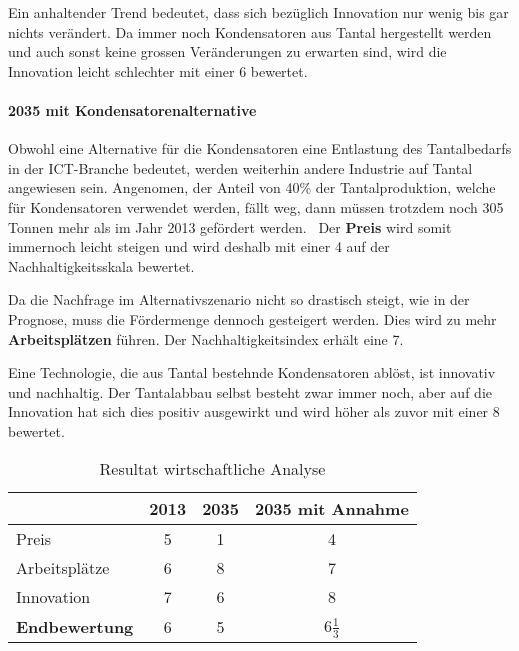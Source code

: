 Ein anhaltender Trend bedeutet, dass sich bezüglich Innovation nur wenig bis gar nichts verändert. Da immer noch Kondensatoren aus Tantal hergestellt werden und auch sonst keine grossen Veränderungen zu erwarten sind, wird die Innovation leicht schlechter mit einer 6 bewertet.

\paragraph{2035 mit Kondensatorenalternative}
Obwohl eine Alternative für die Kondensatoren eine Entlastung des Tantalbedarfs in der ICT-Branche bedeutet, werden weiterhin andere Industrie auf Tantal angewiesen sein. Angenomen, der Anteil von 40\% der Tantalproduktion, welche für Kondensatoren verwendet werden, fällt weg, dann müssen trotzdem noch 305 Tonnen mehr als im Jahr 2013 gefördert werden.~\cite{tantal_price2} Der \textbf{Preis} wird somit immernoch leicht steigen und wird deshalb mit einer 4 auf der Nachhaltigkeitsskala bewertet.

Da die Nachfrage im Alternativszenario nicht so drastisch steigt, wie in der Prognose, muss die Fördermenge dennoch gesteigert werden. Dies wird zu mehr \textbf{Arbeitsplätzen} führen. Der Nachhaltigkeitsindex erhält eine 7.

Eine Technologie, die aus Tantal bestehnde Kondensatoren ablöst, ist innovativ und nachhaltig. Der Tantalabbau selbst besteht zwar immer noch, aber auf die Innovation hat sich dies positiv ausgewirkt und wird höher als zuvor mit einer 8 bewertet.

\begin{table}[h]
  \centering
  \begin{tabular}{l|ccc}            & \textbf{2013} & \textbf{2035} & \textbf{2035 mit Annahme}
    \\ \hline Preis                 & 5             & 1             & 4
    \\ Arbeitsplätze                & 6             & 8             & 7
    \\ Innovation                   & 7             & 6             & 8
    \\ \hline \textbf{Endbewertung} & 6             & 5             & 6\(\frac{1}{3}\)
  \end{tabular}
  \caption{Resultat wirtschaftliche Analyse}
\end{table}
